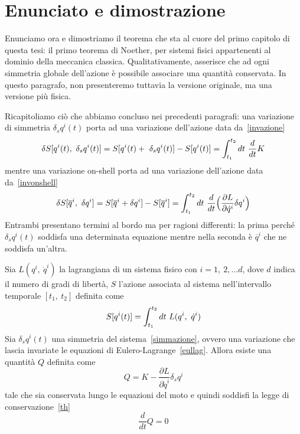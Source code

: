 \section{Enunciato e dimostrazione}
    Enunciamo ora e dimostriamo il teorema che sta al cuore del primo capitolo di questa tesi: il primo teorema di Noether, per sistemi fisici appartenenti al dominio della meccanica classica. Qualitativamente, asserisce che ad ogni simmetria globale dell'azione è possibile associare una quantità conservata. In questo paragrafo, non presenteremo tuttavia la versione originale, ma una versione più fisica. 

    Ricapitoliamo ciò che abbiamo concluso nei precedenti paragrafi: una variazione di simmetria $\delta_s q^i(t)$ porta ad una variazione dell'azione data da~\eqref{invazione} 
    \begin{equation*}
        \delta S[q^i(t), ~\delta_s q^i(t)] = S[q^i(t) + ~\delta_s q^i(t)] - S[q^i(t)] = \int_{t_1}^{t_2}dt~ \frac{d}{dt} K
    \end{equation*}
    mentre una variazione on-shell porta ad una variazione dell'azione data da~\eqref{invonshell} 
    \begin{equation*}
        \delta S[\overline q^i,~\delta q^i] = S[\overline q^i + \delta q^i] - S[\overline q^i] = \int_{t_1}^{t_2}dt~ \frac{d}{dt} \Big( \frac{\partial L}{\partial\dot q^i} \delta q^i \Big )
    \end{equation*}
    Entrambi presentano termini al bordo ma per ragioni differenti: la prima perché $\delta_s q^i(t)$ soddisfa una determinata equazione mentre nella seconda è $\overline q^i$ che ne soddisfa un'altra.

    \begin{theorem}
        Sia $L(q^i,~\dot q^i)$ la lagrangiana di un sistema fisico con $i=1,~2,\ldots d$, dove $d$ indica il numero di gradi di libertà, $S$ l'azione associata al sistema nell'intervallo temporale $[t_1,~t_2]$ definita come
    \begin{equation*}
        S[q^i(t)] = \int_{t_1}^{t_2}dt~ L(q^i,~\dot q^i)
    \end{equation*}
        Sia $\delta_s q^i(t)$ una simmetria del sistema~\eqref{simmazione}, ovvero una variazione che lascia invariate le equazioni di Eulero-Lagrange~\eqref{eullag}. Allora esiste una quantità $Q$ definita come
    \begin{equation}\label{carica}
        Q = K - \frac{\partial L}{\partial \dot q^i} \delta_s q^i
    \end{equation}
        tale che sia conservata lungo le equazioni del moto e quindi soddisfi la legge di conservazione~\eqref{th}
    \begin{equation*} 
        \frac{d}{dt} Q = 0
    \end{equation*}
    \end{theorem}

